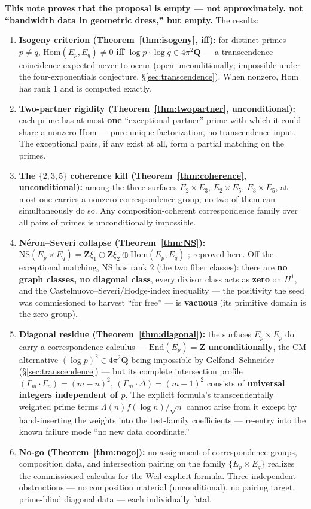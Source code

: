 \documentclass[11pt]{article}
\theoremstyle{definition}
\theoremstyle{remark}
\newcommand{\Z}{\mathbf{Z}}
\newcommand{\Q}{\mathbf{Q}}
\newcommand{\NS}{\mathrm{NS}}
\newcommand{\Hom}{\mathrm{Hom}}
\newcommand{\End}{\mathrm{End}}
\begin{document}
\textbf{This note proves that the proposal is empty --- not approximately,
not ``bandwidth data in geometric dress,'' but empty.} The results:

\begin{enumerate}
\item \textbf{Isogeny criterion (Theorem~\ref{thm:isogeny}, iff):} for
distinct primes $p \neq q$, $\Hom(E_p, E_q) \neq 0$ \textbf{iff}
$\log p \cdot \log q \in 4\pi^2\Q$ --- a transcendence coincidence expected
never to occur (open unconditionally; impossible under the four-exponentials
conjecture, \S\ref{sec:transcendence}). When nonzero, $\Hom$ has rank $1$
and is computed exactly.
\item \textbf{Two-partner rigidity (Theorem~\ref{thm:twopartner},
unconditional):} each prime has at most \textbf{one} ``exceptional partner''
prime with which it could share a nonzero $\Hom$ --- pure unique
factorization, no transcendence input. The exceptional pairs, if any exist
at all, form a partial matching on the primes.
\item \textbf{The $\{2,3,5\}$ coherence kill (Theorem~\ref{thm:coherence},
unconditional):} among the three surfaces $E_2\times E_3$, $E_2\times E_5$,
$E_3\times E_5$, at most one carries a nonzero correspondence group; no two
of them can simultaneously do so. Any composition-coherent correspondence
family over all pairs of primes is unconditionally impossible.
\item \textbf{N\'eron--Severi collapse (Theorem~\ref{thm:NS}):}
$\NS(E_p \times E_q) = \Z\xi_1 \oplus \Z\xi_2 \oplus \Hom(E_p, E_q)$
\cite[Ch.~5]{BL}; reproved here. Off the exceptional matching, $\NS$ has
rank $2$ (the two fiber classes): there are \textbf{no graph classes, no
diagonal class}, every divisor class acts as \textbf{zero} on $H^1$, and the
Castelnuovo--Severi/Hodge-index inequality --- the positivity the seed was
commissioned to harvest ``for free'' --- is \textbf{vacuous} (its primitive
domain is the zero group).
\item \textbf{Diagonal residue (Theorem~\ref{thm:diagonal}):} the surfaces
$E_p \times E_p$ do carry a correspondence calculus ---
$\End(E_p) = \Z$ \textbf{unconditionally}, the CM alternative
$(\log p)^2 \in 4\pi^2\Q$ being impossible by Gelfond--Schneider
(\S\ref{sec:transcendence}) --- but its complete intersection profile
$(\Gamma_m\cdot\Gamma_n) = (m-n)^2$, $(\Gamma_m\cdot\Delta) = (m-1)^2$
consists of \textbf{universal integers independent of $p$}. The explicit
formula's transcendentally weighted prime terms $\Lambda(n) f(\log n)/\sqrt{n}$
cannot arise from it except by hand-inserting the weights into the
test-family coefficients --- re-entry into the known failure mode ``no new
data coordinate.''
\item \textbf{No-go (Theorem~\ref{thm:nogo}):} no assignment of
correspondence groups, composition data, and intersection pairing on the
family $\{E_p \times E_q\}$ realizes the commissioned calculus for the Weil
explicit formula. Three independent obstructions --- no composition material
(unconditional), no pairing target, prime-blind diagonal data --- each
individually fatal.
\end{enumerate}
\end{document}
